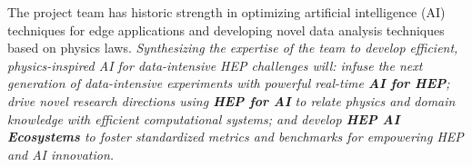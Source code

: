 The project team has historic strength in optimizing artificial intelligence (AI) techniques for edge applications and developing novel data analysis techniques based on physics laws. \textit{Synthesizing the expertise of the team to develop efficient, physics-inspired AI for data-intensive HEP challenges will: infuse the next generation of data-intensive experiments with powerful real-time \textbf{AI for HEP}; drive novel research directions using \textbf{HEP for AI} to relate physics and domain knowledge with efficient computational systems; and develop \textbf{HEP AI Ecosystems} to foster standardized metrics and benchmarks for empowering HEP and AI innovation.}

